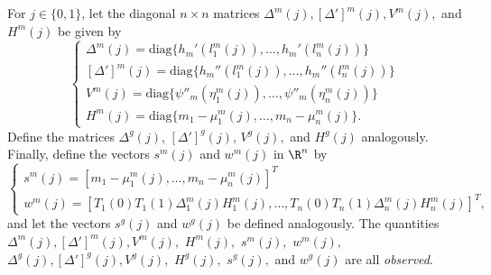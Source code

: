 \documentclass[11pt]{article}
\begin{document}
\begin{appendices}
\begin{refsection}
For $j \in \{0,1\}$, let the diagonal $n \times n$ matrices $\Delta^m(j), [\Delta']^m(j), V^m(j),$ and $H^m(j)$ be given by
$$\begin{cases}
\Delta^m(j) = \textrm{diag} \{ h_m'(l_1^m(j)), \dots, h_m'( l_n^m(j) ) \} \\
[\Delta']^m(j) = \textrm{diag} \{ h_m''(l_1^m(j)), \dots, h_m''( l_n^m(j)) \} \\
V^m(j) = \textrm{diag} \{\psi''_m( \eta^m_1(j)), \dots, \psi''_m( \eta^m_n(j))\} \\
H^m(j) = \textrm{diag} \{m_1 - \mu_1^m(j), \dots, m_n - \mu_n^m(j)\} .
\end{cases}
$$
Define the matrices $\Delta^g(j)$, $[\Delta']^{g}(j)$, $V^g(j),$ and $H^g(j)$ analogously. Finally, define the vectors $s^m(j)$ and $w^m(j)$ in $\R^n$ by 
$$ \begin{cases}
s^m(j) = [m_1 - \mu_1^m(j), \dots, m_n - \mu_n^m(j) ]^T \\ w^m(j) = [ T_1(0)T_1(1)\Delta^m_1(j) H^m_1(j), \dots, T_n(0)T_n(1)\Delta_n^m(j) H_n^m(j)]^T,
\end{cases} $$
and let the vectors $s^g(j)$ and $w^g(j)$ be defined analogously. The quantities $\Delta^m(j), [\Delta']^m(j), V^m(j),$ $H^m(j),$ $s^m(j),$ $w^m(j),$ $\Delta^g(j), [\Delta']^g(j), V^g(j),$ $H^g(j),$ $s^g(j),$ and $w^g(j)$ are all \textit{observed}. 


\end{refsection}
\end{appendices}
\end{document}
